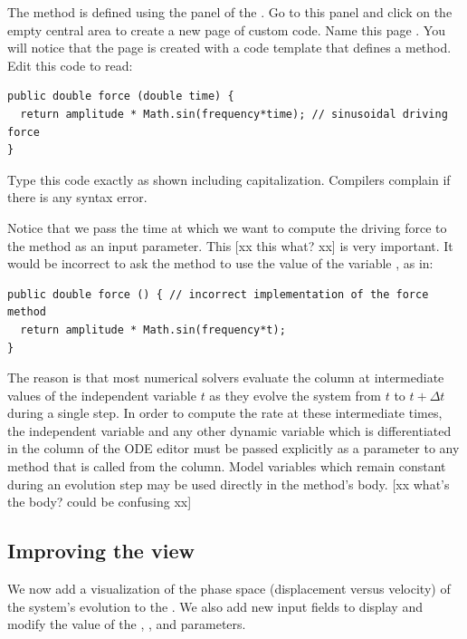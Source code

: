 The  method is defined using the  panel of the . Go to this panel and click on the empty central area to create a new page of custom code. Name this page . You will notice that the page is created with a code template that defines a method. Edit this code to read:
\begin{listing}
\begin{verbatim}
public double force (double time) {
  return amplitude * Math.sin(frequency*time); // sinusoidal driving force
}
\end{verbatim}
\end{listing}
Type this code exactly as shown including capitalization. Compilers complain if there is any syntax error.

Notice that we pass the time at which we want to compute the driving force to the method as an input parameter. This [xx this what? xx] is very important. It would be incorrect to ask the method to use the value of the variable , as in:
\begin{listing}
\begin{verbatim}
public double force () { // incorrect implementation of the force method
  return amplitude * Math.sin(frequency*t);
}
\end{verbatim}
\end{listing}
The reason is that most numerical solvers evaluate the  column at intermediate values of the independent variable $t$ as they evolve the system from $t$ to $t+\Delta t$ during a single step. In order to compute the rate at these intermediate times, the independent variable and any other dynamic variable which is differentiated in the  column of the ODE editor must be passed explicitly as a parameter to any method that is called from the  column. Model variables which remain constant during an evolution step may be used directly in the method's body. [xx what's the body? could be confusing xx]

\subsection{Improving the view}\label{section:02ModifyingView}

We now add a visualization of the phase space (displacement versus velocity) of the system's evolution to the . We also add new input fields to display and modify the value of the , , and  parameters.

